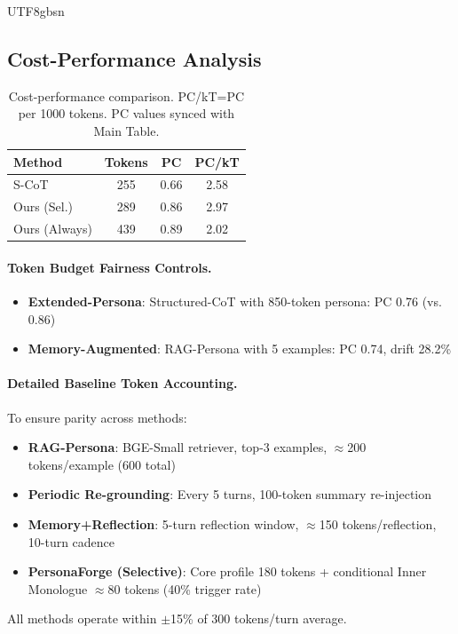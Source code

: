 \documentclass[11pt]{article}
\begin{document}
\begin{CJK*}{UTF8}{gbsn}
\subsection{Cost-Performance Analysis}
\label{sec:cost_analysis}

\begin{table}[h]
\centering
\small
\begin{tabular}{lccc}
\toprule
\textbf{Method} & \textbf{Tokens} & \textbf{PC} & \textbf{PC/kT} \\
\midrule
S-CoT & 255 & 0.66 & 2.58 \\
Ours (Sel.) & 289 & 0.86 & 2.97 \\
Ours (Always) & 439 & 0.89 & 2.02 \\
\bottomrule
\end{tabular}
\caption{Cost-performance comparison. PC/kT=PC per 1000 tokens. PC values synced with Main Table.}
\label{tab:cost}
\end{table}

\paragraph{Token Budget Fairness Controls.}
\begin{itemize}
    \item \textbf{Extended-Persona}: Structured-CoT with 850-token persona: PC 0.76 (vs. 0.86)
    \item \textbf{Memory-Augmented}: RAG-Persona with 5 examples: PC 0.74, drift 28.2\%
\end{itemize}

\paragraph{Detailed Baseline Token Accounting.} To ensure parity across methods:
\begin{itemize}
    \item \textbf{RAG-Persona}: BGE-Small retriever, top-3 examples, $\approx$200 tokens/example (600 total)
    \item \textbf{Periodic Re-grounding}: Every 5 turns, 100-token summary re-injection
    \item \textbf{Memory+Reflection}: 5-turn reflection window, $\approx$150 tokens/reflection, 10-turn cadence
    \item \textbf{PersonaForge (Selective)}: Core profile 180 tokens + conditional Inner Monologue $\approx$80 tokens (40\% trigger rate)
\end{itemize}
All methods operate within $\pm$15\% of 300 tokens/turn average.


\end{CJK*}
\end{document}
